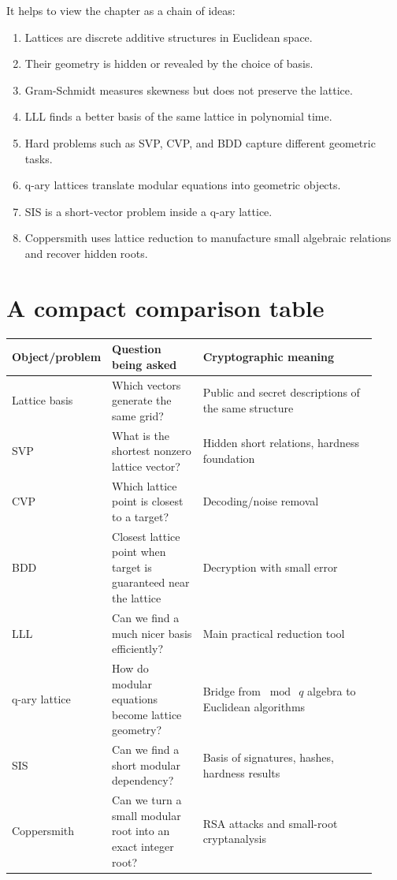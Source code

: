 \documentclass[11pt]{article}
\begin{document}
It helps to view the chapter as a chain of ideas:
\begin{enumerate}
    \item Lattices are discrete additive structures in Euclidean space.
    \item Their geometry is hidden or revealed by the choice of basis.
    \item Gram-Schmidt measures skewness but does not preserve the lattice.
    \item LLL finds a better basis of the same lattice in polynomial time.
    \item Hard problems such as SVP, CVP, and BDD capture different geometric tasks.
    \item q-ary lattices translate modular equations into geometric objects.
    \item SIS is a short-vector problem inside a q-ary lattice.
    \item Coppersmith uses lattice reduction to manufacture small algebraic relations and recover hidden roots.
\end{enumerate}

\section{A compact comparison table}

\begin{center}
\renewcommand{\arraystretch}{1.35}
\begin{tabular}{>{\raggedright\arraybackslash}p{0.19\linewidth} >{\raggedright\arraybackslash}p{0.25\linewidth} >{\raggedright\arraybackslash}p{0.48\linewidth}}
\toprule
\textbf{Object/problem} & \textbf{Question being asked} & \textbf{Cryptographic meaning} \\
\midrule
Lattice basis & Which vectors generate the same grid? & Public and secret descriptions of the same structure \\
SVP & What is the shortest nonzero lattice vector? & Hidden short relations, hardness foundation \\
CVP & Which lattice point is closest to a target? & Decoding/noise removal \\
BDD & Closest lattice point when target is guaranteed near the lattice & Decryption with small error \\
LLL & Can we find a much nicer basis efficiently? & Main practical reduction tool \\
q-ary lattice & How do modular equations become lattice geometry? & Bridge from $\bmod\ q$ algebra to Euclidean algorithms \\
SIS & Can we find a short modular dependency? & Basis of signatures, hashes, hardness results \\
Coppersmith & Can we turn a small modular root into an exact integer root? & RSA attacks and small-root cryptanalysis \\
\bottomrule
\end{tabular}
\end{center}
\end{document}
